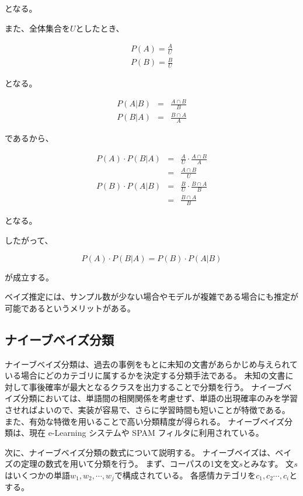 \documentclass[11pt,a4j]{jsarticle}
\begin{document}
となる。

また、全体集合を$U$としたとき、

\begin{eqnarray*}
P(A) = \frac{A}{U}\\
P(B) = \frac{B}{U}
\end{eqnarray*}

となる。

\begin{eqnarray*}
P(A|B) & = & \frac{A \cap B}{B}\\
P(B|A) & = & \frac{B \cap A}{A}
\end{eqnarray*}

であるから、

\begin{eqnarray*}
P(A) \cdot P(B|A) & = & \frac{A}{U} \cdot \frac{A \cap B}{A}\\
               & = & \frac{A \cap B}{U}\\
P(B) \cdot P(A|B)  & = &\frac{B}{U} \cdot \frac{B \cap A}{B}\\
                  & = & \frac{B \cap A}{B}
\end{eqnarray*}

となる。

したがって、

\[ P(A) \cdot P(B|A)=P(B) \cdot P(A|B) \]

が成立する。

ベイズ推定には、サンプル数が少ない場合やモデルが複雑である場合にも推定が可能であるというメリットがある。

 \subsection{ナイーブベイズ分類}\label{sec:defnaivebayes}
ナイーブベイズ分類は、過去の事例をもとに未知の文書があらかじめ与えられている場合にどのカテゴリに属するかを決定する分類手法である。
未知の文書に対して事後確率が最大となるクラスを出力することで分類を行う。
ナイーブベイズ分類においては、単語間の相関関係を考慮せず、単語の出現確率のみを学習させればよいので、実装が容易で、さらに学習時間も短いことが特徴である。
また、有効な特徴を用いることで高い分類精度が得られる。
ナイーブベイズ分類は、現在 e-Learning システムや SPAM フィルタに利用されている。

次に、ナイーブベイズ分類の数式について説明する。
ナイーブベイズは、ベイズの定理の数式を用いて分類を行う。
まず、コーパスの1文を文$s$とみなす。
文$s$はいくつかの単語$w_1,w_2, \cdots ,w_j$で構成されている。
各感情カテゴリを$c_1,c_2 \cdots ,c_i$とする。
\end{document}
